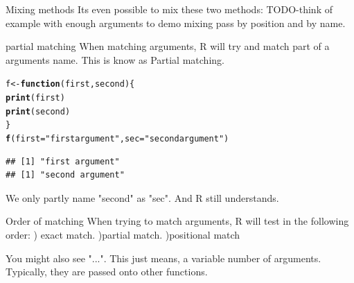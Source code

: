 \documentclass{beamer}\usepackage[]{graphicx}\usepackage[]{color}
\makeatletter
\newcommand{\hlstr}[1]{\textcolor[rgb]{0.192,0.494,0.8}{#1}}%
\newcommand{\hlstd}[1]{\textcolor[rgb]{0.345,0.345,0.345}{#1}}%
\newcommand{\hlkwa}[1]{\textcolor[rgb]{0.161,0.373,0.58}{\textbf{#1}}}%
\newcommand{\hlkwb}[1]{\textcolor[rgb]{0.69,0.353,0.396}{#1}}%
\newcommand{\hlkwc}[1]{\textcolor[rgb]{0.333,0.667,0.333}{#1}}%
\newcommand{\hlkwd}[1]{\textcolor[rgb]{0.737,0.353,0.396}{\textbf{#1}}}%
\newenvironment{kframe}{%
 \def\at@end@of@kframe{}%
 \ifinner\ifhmode%
  \def\at@end@of@kframe{\end{minipage}}%
  \begin{minipage}{\columnwidth}%
 \fi\fi%
 \def\FrameCommand##1{\hskip\@totalleftmargin \hskip-\fboxsep
 \colorbox{shadecolor}{##1}\hskip-\fboxsep
     \hskip-\linewidth \hskip-\@totalleftmargin \hskip\columnwidth}%
 \MakeFramed {\advance\hsize-\width
   \@totalleftmargin\z@ \linewidth\hsize
   \@setminipage}}%
 {\par\unskip\endMakeFramed%
 \at@end@of@kframe}
\newenvironment{knitrout}{}{} %
\makeatother
\begin{document}
\begin{frame}[fragile]{Mixing methods}
Its even possible to mix these two methods:
\linebreak
TODO-think of example with enough arguments to demo mixing pass by position and by name.


\end{frame}

\begin{frame}[fragile]{partial matching}
When matching arguments, R will try and match part of a arguments name. This is know as Partial matching.
\begin{knitrout}
\color{fgcolor}\begin{kframe}
\begin{alltt}
\hlstd{f} \hlkwb{<-} \hlkwa{function}\hlstd{(}\hlkwc{first}\hlstd{,} \hlkwc{second}\hlstd{) \{}
    \hlkwd{print}\hlstd{(first)}
    \hlkwd{print}\hlstd{(second)}
\hlstd{\}}
\hlkwd{f}\hlstd{(}\hlkwc{first} \hlstd{=} \hlstr{"first argument"}\hlstd{,} \hlkwc{sec} \hlstd{=} \hlstr{"second argument"}\hlstd{)}
\end{alltt}
\begin{verbatim}
## [1] "first argument"
## [1] "second argument"
\end{verbatim}
\end{kframe}
\end{knitrout}

We only partly name "second" as "sec". And R still understands.
\end{frame}

\begin{frame}[fragile]{Order of matching}
\linebreak
When trying to match arguments, R will test in the following order:
) exact match.
)partial match.
)positional match
\end{frame}

\begin{frame}[fragile]{}
You might also see "...".
\linebreak
This just means, a variable number of arguments. Typically, they are passed onto other functions.
\end{frame}
\end{document}
